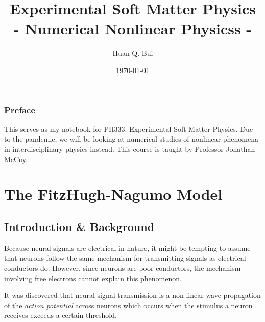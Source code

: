 \documentclass{book}
\theoremstyle{definition}
\begin{document}
\begin{titlepage}\centering
 \clearpage
 \title{\bf{Experimental Soft Matter Physics \\
 	- Numerical Nonlinear Physicss - }}
 \author{\bigskip Huan Q. Bui}
 \date{\today}
 \maketitle
 \thispagestyle{empty}
\end{titlepage}

\subsection*{Preface}

This serves as my notebook for PH333: Experimental Soft Matter Physics. Due to the pandemic, we will be looking at numerical studies of nonlinear phenomena in interdisciplinary physics instead. This course is taught by Professor Jonathan McCoy. 



\newpage
\tableofcontents
\newpage



\chapter{The FitzHugh-Nagumo Model}



\section{Introduction \& Background}

Because neural signals are electrical in nature, it might be tempting to assume that neurons follow the same mechanism for transmitting signals as electrical conductors do. However, since neurons are poor conductors, the mechanism involving free electrons cannot explain this phenomenon. 

It was discovered that neural signal transmission is a non-linear wave propagation of the \textit{action potential} across neurons which occurs when the stimulus a neuron receives exceeds a certain threshold. 
\end{document}
